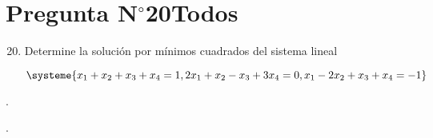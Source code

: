 \section{Pregunta N$^{\circ}$20\qquad Todos}

\begin{frame}
	\begin{enumerate}\setcounter{enumi}{19}
		\item

		      Determine la solución por mínimos cuadrados del sistema
					lineal

		      \begin{equation*}
			      \systeme{
			      x_{1}+x_{2}+x_{3}+x_{4}=1,
			      2x_{1}+x_{2}-x_{3}+3x_{4}=0,
			      x_{1}-2x_{2}+x_{3}+x_{4}=-1
			      }
		      \end{equation*}
	\end{enumerate}

	\begin{solution}

		.
	\end{solution}
\end{frame}

\begin{frame}
	\begin{solution}

		.
	\end{solution}
\end{frame}